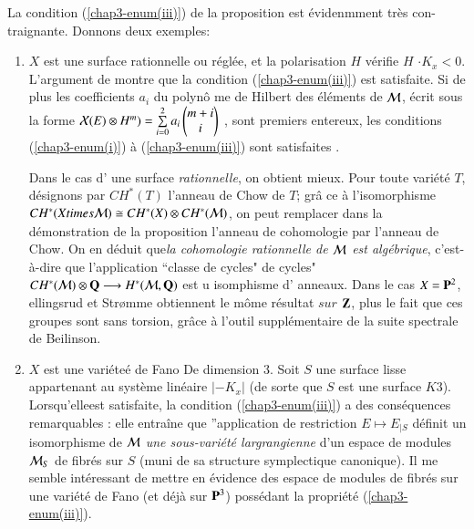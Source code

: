 \begin{remarque*}
La condition (\ref{chap3-enum(iii)}) de la proposition est \'evidenmment tr\`es con-traignante. Donnons deux exemples:
\begin{enumerate}[{\rm a)}]
\item $X$ est une surface rationnelle ou r\'egl\'ee, et la polarisation $H$ v\'erifie $H$ $\cdot K_{x}<0$. L'argument de \cite[cor. 6.7.3]{chap3-keyM} montre que la condition (\ref{chap3-enum(iii)}) est satisfaite. Si de plus les coefficients $a_{i}$ du polyn\^o me de Hilbert des \'el\'ements de $\mathcal{M}$, \'ecrit sous la forme\label{chap3-enmu(a))}
$
\mathcal{X}(E)\otimes H^{m}) = \sum\limits_{i=0}^{2}a_{i}
\begin{pmatrix}
m+i\\
i
\end{pmatrix}
$
, sont premiers entereux, les conditions (\ref{chap3-enum(i)}) \`a (\ref{chap3-enum(iii)}) sont satisfaites \cite[$\calx$6]{chap3-keyM}.

Dans le cas d' une surface \textit{rationnelle}, on obtient mieux. Pour toute vari\'et\'e $T$, d\'esignons par $C H^{*}(T)$ l'anneau de Chow de $T$; gr\^a ce \`a l'isomorphisme $C H^{*}(X times \mathcal{M}) \cong C H ^{*}(X) \otimes C H^{*}(\mathcal{M})$, on peut remplacer dans la d\'emonstration de la proposition l'anneau de cohomologie par l'anneau de Chow. On en d\'eduit que\textit{la cohomologie rationnelle de $\mathcal{M}$ est alg\'ebrique}, c'est-\`a-dire que l'application ``classe de cycles" de cycles" $C H^{*}(\mathcal{M}) \otimes \mathbf{Q} \longrightarrow H^{*}(\cal M , \mathbf{Q})$ est u isomphisme d' anneaux. Dans le cas $X= \mathbf{P}^{2}$, ellingsrud et Str\o mme obtiennent le m\^ome r\'esultat $sur$ $\mathbf{Z}$, plus le fait que ces groupes sont sans torsion, gr\^ace \`a l'outil suppl\'ementaire de la suite spectrale de Beilinson. 

\item $X$ est une vari\'ete\'e de Fano De dimension 3. Soit $S$ une surface lisse appartenant au syst\`eme lin\'eaire $|-K_{x}|$ (de sorte que $S$ est une surface $K3$). Lorsqu'elle\pageoriginale est satisfaite, la condition (\ref{chap3-enum(iii)}) a des cons\'equences remarquables \cite{chap3-keyT}: elle entra\^ine que ''application de restriction $E \longmapsto E_{|S}$ d\'efinit un isomorphisme de $\mathcal{M}$ \textit{une sous-vari\'et\'e largrangienne} d'un espace de modules $\mathcal{M}_{S}$ de fibr\'es sur $S$ (muni de sa structure symplectique canonique). Il me semble int\'eressant de mettre en \'evidence des espace de modules de fibr\'es sur une vari\'et\'e de Fano (et d\'ej\`a sur $\mathbf{P}^{3}$) poss\'edant la propri\'et\'e (\ref{chap3-enum(iii)}). \label{chap3-enmu(b))} 
\end{enumerate}
\end{remarque*}

